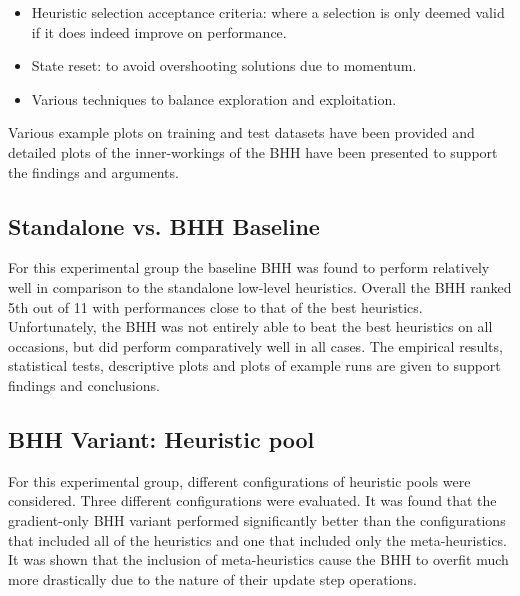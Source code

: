 \begin{itemize}
    \item {}Heuristic selection acceptance criteria: where a selection is only deemed valid if it does indeed improve on performance.
    
    \item State reset: to avoid overshooting solutions due to momentum.
    
    \item Various techniques to balance exploration and exploitation.
\end{itemize}

Various example plots on training and test datasets have been provided and detailed plots of the inner-workings of the \ac{BHH} have been presented to support the findings and arguments.

\subsection{Standalone vs. \ac{BHH} Baseline}
\label{sec:conclusion:results:summary:standalone}

For this experimental group the baseline \ac{BHH} was found to perform relatively well in comparison to the standalone low-level heuristics. Overall the \ac{BHH} ranked 5th out of 11 with performances close to that of the best heuristics. Unfortunately, the \ac{BHH} was not entirely able to beat the best heuristics on all occasions, but did perform comparatively well in all cases. The empirical results, statistical tests, descriptive plots and plots of example runs are given to support findings and conclusions.

\subsection{\ac{BHH} Variant: Heuristic pool}
\label{sec:conclusion:results:summary:heuristic_pool}

For this experimental group, different configurations of heuristic pools were considered. Three different configurations were evaluated. It was found that the gradient-only \ac{BHH} variant performed significantly better than the configurations that included all of the heuristics and one that included only the meta-heuristics. It was shown that the inclusion of meta-heuristics cause the \ac{BHH} to overfit much more drastically due to the nature of their update step operations.

